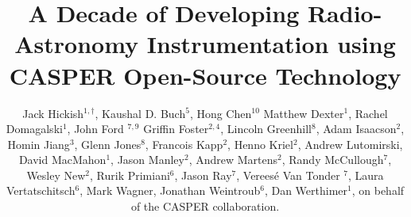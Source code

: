 \documentclass{ws-jai}
\begin{document}
\catchline{}{}{}{}{} %


\title{A Decade of Developing Radio-Astronomy Instrumentation using CASPER Open-Source Technology}

\author{Jack Hickish$^{1,\dagger}$,
 Kaushal D. Buch$^5$,
 Hong Chen$^{10}$
 Matthew Dexter$^1$,
 Rachel Domagalski$^1$,
 John Ford $^{7,9}$
 Griffin Foster$^{2,4}$,
 Lincoln Greenhill$^8$,
 Adam Isaacson$^2$,
 Homin Jiang$^3$,
 Glenn Jones$^8$,
 Francois Kapp$^2$,
 Henno Kriel$^2$,
 Andrew Lutomirski,
 David MacMahon$^1$,
 Jason Manley$^2$,
 Andrew Martens$^2$,
 Randy McCullough$^7$,
 Wesley New$^2$,
 Rurik Primiani$^6$,
 Jason Ray$^7$,
 Vereesé Van Tonder $^7$,
 Laura Vertatschitsch$^6$,
 Mark Wagner,
 Jonathan Weintroub$^6$,
 Dan Werthimer$^1$,
 on behalf of the CASPER collaboration.
}


\address{
$^1$Radio Astronomy Laboratory, UC Berkeley, Berkeley, CA 94720, USA \\
$^2$SKA Africa, SKA-SA, 3rd Floor, The Park, Park Road, Pinelands, Cape Town, 7405, South Africa \\
$^3$Academia Sinica, Institute of Astronomy and Astrophysics, Taiwan \\
$^4$Department of Physics and Electronics, Rhodes University, P.O. Box 94, Grahamstown 6140, South Africa\\
$^5$Digital Backend Group, Giant Metrewave Radio Telescope, NCRA-TIFR, Pune, 410504, India \\
$^6$Harvard-Smithsonian Center for Astrophysics, 60 Garden Street, Cambridge, MA 02138, USA \\
$^7$National Radio Astronomy Observatory, 166 Observatory Rd, Green Bank, WV 24944, USA \\
$^8$Department of Physics, Columbia University, 550 W. 120th St. New York, NY 10027, USA \\
$^9$Steward Observatory, University of Arizona, Tucson, AZ 85721, USA \\
$^{10}$UC Berkeley, Berkeley, CA 94720, USA \\
}

\maketitle
{}
\end{document}
